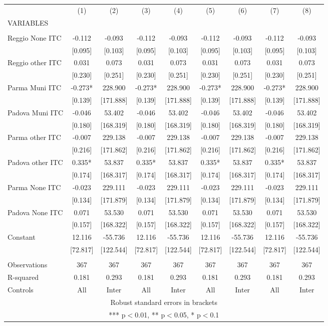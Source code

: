 \begin{tabular}{lcccccccc} \hline
 & (1) & (2) & (3) & (4) & (5) & (6) & (7) & (8) \\
VARIABLES &  &  &  &  &  &  &  &  \\ \hline
 &  &  &  &  &  &  &  &  \\
Reggio None ITC & -0.112 & -0.093 & -0.112 & -0.093 & -0.112 & -0.093 & -0.112 & -0.093 \\
 & [0.095] & [0.103] & [0.095] & [0.103] & [0.095] & [0.103] & [0.095] & [0.103] \\
Reggio other ITC & 0.031 & 0.073 & 0.031 & 0.073 & 0.031 & 0.073 & 0.031 & 0.073 \\
 & [0.230] & [0.251] & [0.230] & [0.251] & [0.230] & [0.251] & [0.230] & [0.251] \\
Parma Muni ITC & -0.273* & 228.900 & -0.273* & 228.900 & -0.273* & 228.900 & -0.273* & 228.900 \\
 & [0.139] & [171.888] & [0.139] & [171.888] & [0.139] & [171.888] & [0.139] & [171.888] \\
Padova Muni ITC & -0.046 & 53.402 & -0.046 & 53.402 & -0.046 & 53.402 & -0.046 & 53.402 \\
 & [0.180] & [168.319] & [0.180] & [168.319] & [0.180] & [168.319] & [0.180] & [168.319] \\
Parma other ITC & -0.007 & 229.138 & -0.007 & 229.138 & -0.007 & 229.138 & -0.007 & 229.138 \\
 & [0.216] & [171.862] & [0.216] & [171.862] & [0.216] & [171.862] & [0.216] & [171.862] \\
Padova other ITC & 0.335* & 53.837 & 0.335* & 53.837 & 0.335* & 53.837 & 0.335* & 53.837 \\
 & [0.174] & [168.317] & [0.174] & [168.317] & [0.174] & [168.317] & [0.174] & [168.317] \\
Parma None ITC & -0.023 & 229.111 & -0.023 & 229.111 & -0.023 & 229.111 & -0.023 & 229.111 \\
 & [0.134] & [171.879] & [0.134] & [171.879] & [0.134] & [171.879] & [0.134] & [171.879] \\
Padova None ITC & 0.071 & 53.530 & 0.071 & 53.530 & 0.071 & 53.530 & 0.071 & 53.530 \\
 & [0.157] & [168.322] & [0.157] & [168.322] & [0.157] & [168.322] & [0.157] & [168.322] \\
Constant & 12.116 & -55.736 & 12.116 & -55.736 & 12.116 & -55.736 & 12.116 & -55.736 \\
 & [72.817] & [122.544] & [72.817] & [122.544] & [72.817] & [122.544] & [72.817] & [122.544] \\
 &  &  &  &  &  &  &  &  \\
Observations & 367 & 367 & 367 & 367 & 367 & 367 & 367 & 367 \\
R-squared & 0.181 & 0.293 & 0.181 & 0.293 & 0.181 & 0.293 & 0.181 & 0.293 \\
 Controls & All & Inter & All & Inter & All & Inter & All & Inter \\ \hline
\multicolumn{9}{c}{ Robust standard errors in brackets} \\
\multicolumn{9}{c}{ *** p$<$0.01, ** p$<$0.05, * p$<$0.1} \\
\end{tabular}
